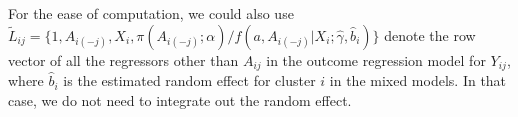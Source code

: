 \documentclass[oupdraft]{bio}
\begin{document}
{\color{red}For the ease of computation, we could also use $\tilde L_{ij}=\{1,A_{i(-j)},X_i,\pi(A_{i(-j)};\alpha)/f(a, A_{i(-j)}|X_i;\hat\gamma,\hat b_i)\}$ denote the row vector of all the regressors other than $A_{ij}$ in the outcome regression model for $Y_{ij}$, where $\hat b_i$ is the estimated random effect for cluster $i$ in the mixed models. In that case, we do not need to integrate out the random effect. }%

%
%
%
%
\end{document}
